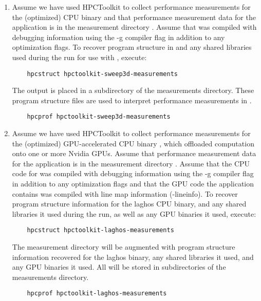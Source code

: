 \documentclass[english]{article}
\begin{document}
\begin{enumerate}
\item 
Assume we have used HPCToolkit to collect performance measurements for the (optimized) CPU binary 
 and that performance measurement data for the application is in the measurement 
directory . 
Assume that  was compiled with debugging information using the -g compiler flag in addition to any
optimization flags. 
To recover program structure in  and any shared libraries used during the run
for use with , execute:
\medskip
\begin{verbatim}
    hpcstruct hpctoolkit-sweep3d-measurements
\end{verbatim}
\medskip
The output is placed in a subdirectory of the measurements directory.
\medskip
These program structure files are used to interpret performance measurements in . 
\medskip
\begin{verbatim}
    hpcprof hpctoolkit-sweep3d-measurements
\end{verbatim}

\item
Assume we have used HPCToolkit to collect performance measurements for the (optimized) GPU-accelerated 
CPU binary , which offloaded computation onto one or more Nvidia GPUs.
Assume that performance measurement data for the application is in the measurement 
directory . 
\medskip
Assume that the CPU code for  was compiled with debugging information using the -g compiler flag in addition to any
optimization flags and that the GPU code the application contains was compiled with line map information (-lineinfo).
\medskip
To recover program structure information for the laghos CPU binary, and any shared libraries it used
during the run, as well as any GPU binaries it used, execute:
\medskip
\begin{verbatim}
    hpcstruct hpctoolkit-laghos-measurements
\end{verbatim}
\medskip
The measurement directory will be augmented with program structure information recovered for the
laghos binary, any shared libraries it used, and any GPU binaries it used.  All will be
stored in subdirectories of the measurements directory.
\medskip
\begin{verbatim}
    hpcprof hpctoolkit-laghos-measurements
\end{verbatim}
\end{enumerate}
\end{document}
